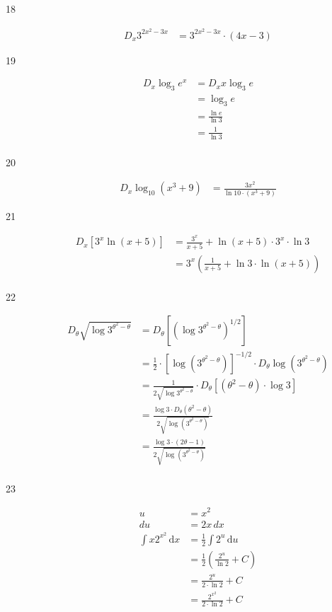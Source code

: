 \documentclass{exam}
\begin{document}
\begin{description}
\item[18]
\begin{align*}
  D_x 3^{2x^2 - 3x} &= 3^{2x^2 - 3x} \cdot (4x - 3)
\end{align*}

\item[19]
\begin{align*}
  D_x \log_3 e^x &= D_x x \log_3 e \\
  &= \log_3 e \\
  &= \frac{\ln e}{\ln 3} \\
  &= \frac{1}{\ln 3} \\
\end{align*}

\item[20]
\begin{align*}
  D_x \log_{10} (x^3 + 9) &= \frac{3x^2}{\ln 10 \cdot (x^3 + 9)}
\end{align*}

\item[21]
\begin{align*}
  D_x \left[ 3^x \ln(x + 5) \right] &= \frac{3^x}{x + 5} + \ln(x + 5) \cdot 3^x \cdot \ln 3 \\
  &= 3^x \left( \frac{1}{x + 5} + \ln 3 \cdot \ln(x + 5) \right) \\
\end{align*}

\item[22]
\begin{align*}
  D_{\theta} \sqrt{ \log 3^{\theta^2 - \theta}} &=  D_{\theta} [ (\log 3^{\theta^2 - \theta})^{1/2} ] \\
    &= \frac{1}{2} \cdot [ \log (3^{\theta^2 - \theta}) ]^{-1/2} \cdot D_{\theta} \log \left(3^{\theta^2 - \theta}\right) \\
    &= \frac{1}{2 \sqrt{ \log 3^{\theta^2 - \theta}}} \cdot  D_{\theta} [  (\theta^2 - \theta) \cdot \log 3 ] \\
    &= \frac{\log 3 \cdot D_{\theta} (\theta^2 - \theta)}{2 \sqrt{\log \left(3^{\theta^2 - \theta}\right)}}  \\
    &= \frac{\log 3 \cdot (2\theta - 1)}{2 \sqrt{\log \left(3^{\theta^2 - \theta}\right)}}  \\
\end{align*}

\item[23]
\begin{align*}
  u &= x^2 \\
  du &= 2 x \, dx
\\
  \int x 2^{x^2} \, \mathrm{d}x &= \frac{1}{2} \int 2^u \, \mathrm{d}u \\
  &= \frac{1}{2} \left( \frac{2^u}{\ln 2} + C \right) \\
  &= \frac{2^u}{2 \cdot \ln 2} + C \\
  &= \frac{2^{x^2}}{2 \cdot \ln 2} + C \\
\end{align*}


\end{description}
\end{document}
